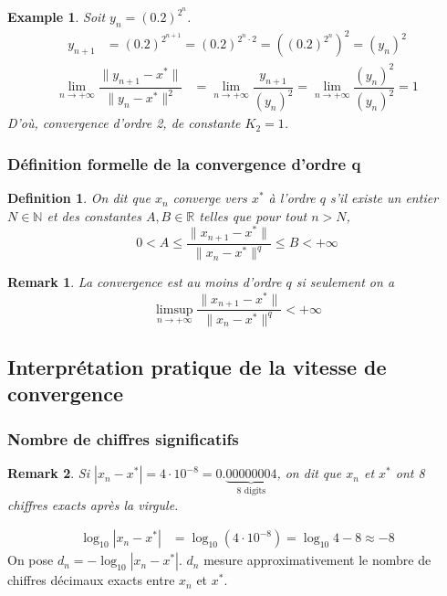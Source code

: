 \documentclass{article}
\newtheorem{definition}{Definition}
\newtheorem{remark}{Remark}
\newtheorem{example}{Example}
\begin{document}
\begin{example}
Soit $y_n = (0.2)^{2^n}$.
\begin{align*}
y_{n+1} &= (0.2)^{2^{n+1}} = (0.2)^{2^n \cdot 2} = ((0.2)^{2^n})^2 = (y_n)^2
\end{align*}
\begin{align*}
\lim\limits_{n \to +\infty} \dfrac{\|y_{n+1}-x^*\|}{\|y_n-x^*\|^2} &= \lim\limits_{n \to +\infty} \dfrac{y_{n+1}}{(y_n)^2} = \lim\limits_{n \to +\infty} \dfrac{(y_n)^2}{(y_n)^2} = 1
\end{align*}
D'où, convergence d'ordre 2, de constante $K_2 = 1$.
\end{example}

\subsubsection{Définition formelle de la convergence d'ordre q}

\begin{definition}
On dit que $x_n$ converge vers $x^*$ à l'ordre $q$ s'il existe un entier $N \in \mathbb{N}$ et des constantes $A, B \in \mathbb{R}$ telles que pour tout $n > N$,
$$ 0 < A \leq \dfrac{\|x_{n+1}-x^*\|}{\|x_n-x^*\|^q} \leq B < +\infty $$
\end{definition}

\begin{remark}
La convergence est au moins d'ordre $q$ si seulement on a
$$ \limsup\limits_{n \to +\infty} \dfrac{\|x_{n+1}-x^*\|}{\|x_n-x^*\|^q} < +\infty $$
\end{remark}

\subsection{Interprétation pratique de la vitesse de convergence}

\subsubsection{Nombre de chiffres significatifs}
\begin{remark}
Si $|x_n - x^*| = 4 \cdot 10^{-8} = 0.\underbrace{00000004}_{\text{8 digits}}$,
on dit que $x_n$ et $x^*$ ont 8 chiffres exacts après la virgule.
\end{remark}

\begin{align*}
\log_{10} |x_n - x^*| &= \log_{10} (4 \cdot 10^{-8}) = \log_{10} 4 - 8 \approx -8
\end{align*}
On pose $d_n = -\log_{10} |x_n - x^*|$. $d_n$ mesure approximativement le nombre de chiffres décimaux exacts entre $x_n$ et $x^*$.
\end{document}
